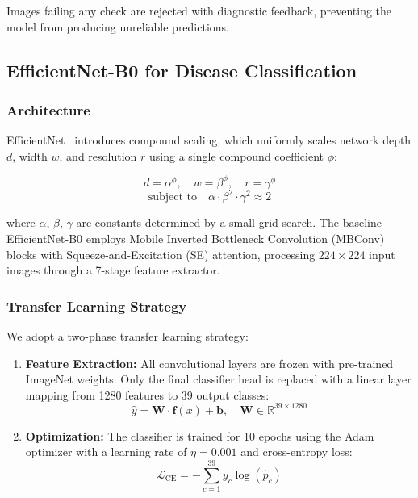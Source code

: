 \documentclass[conference]{IEEEtran}
\begin{document}
Images failing any check are rejected with diagnostic feedback, preventing the model from producing unreliable predictions.

\subsection{EfficientNet-B0 for Disease Classification}

\subsubsection{Architecture}
EfficientNet~\cite{tan2019efficientnet} introduces compound scaling, which uniformly scales network depth $d$, width $w$, and resolution $r$ using a single compound coefficient $\phi$:

\begin{equation}
    d = \alpha^\phi, \quad w = \beta^\phi, \quad r = \gamma^\phi
\end{equation}
\begin{equation}
    \text{subject to} \quad \alpha \cdot \beta^2 \cdot \gamma^2 \approx 2
\end{equation}

\noindent where $\alpha$, $\beta$, $\gamma$ are constants determined by a small grid search. The baseline EfficientNet-B0 employs Mobile Inverted Bottleneck Convolution (MBConv) blocks with Squeeze-and-Excitation (SE) attention, processing $224 \times 224$ input images through a 7-stage feature extractor.

\subsubsection{Transfer Learning Strategy}
We adopt a two-phase transfer learning strategy:
\begin{enumerate}
    \item \textbf{Feature Extraction:} All convolutional layers are frozen with pre-trained ImageNet weights. Only the final classifier head is replaced with a linear layer mapping from 1280 features to 39 output classes:
    \begin{equation}
        \hat{y} = \mathbf{W} \cdot \mathbf{f}(x) + \mathbf{b}, \quad \mathbf{W} \in \mathbb{R}^{39 \times 1280}
    \end{equation}
    
    \item \textbf{Optimization:} The classifier is trained for 10 epochs using the Adam optimizer with a learning rate of $\eta = 0.001$ and cross-entropy loss:
    \begin{equation}
        \mathcal{L}_{\text{CE}} = -\sum_{c=1}^{39} y_c \log(\hat{p}_c)
    \end{equation}
\end{enumerate}
\end{document}
